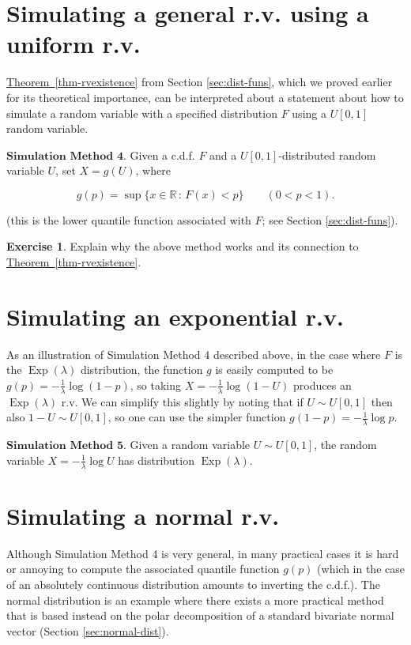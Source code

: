 \documentclass[11pt]{report}
\newcommand{\R}{\mathbb{R}}
\theoremstyle{plain}
\theoremstyle{definition}
\newtheorem{xexercise}[thm]{Exercise}
\begin{document}
\section{Simulating a general r.v. using a uniform r.v.}

\hyperref[thm-rvexistence]{Theorem~\ref*{thm-rvexistence}} from Section
\ref{sec:dist-funs}, which we proved earlier for its
theoretical importance, can be interpreted about a
statement about how to simulate a random variable with
a specified distribution $F$ using a $U[0,1]$ random
variable.

$\textbf{Simulation Method 4.}$ Given a c.d.f. $F$
and a $U[0,1]$-distributed random variable $U$, set
$X=g(U)$, where

\[
g(p) = \sup \{ x\in\R\,:\, F(x) < p \} \qquad (0<p<1).
\]

\noindent (this is the lower quantile function associated with
$F$; see Section \ref{sec:dist-funs}).

\begin{xexercise}
Explain why the above method works and its connection
to \hyperref[thm-rvexistence]{Theorem~\ref*{thm-rvexistence}}.
\end{xexercise}

\section{Simulating an exponential r.v.}

As an illustration of Simulation Method 4 described
above, in the case where $F$ is the
$\operatorname{Exp}(\lambda)$ distribution, the
function $g$ is easily computed to be
$g(p)=-\frac{1}{\lambda} \log(1-p)$, so taking
$X=-\frac{1}{\lambda} \log (1-U)$ produces an
$\operatorname{Exp}(\lambda)$ r.v. We can simplify
this slightly by noting that if $U\sim U[0,1]$ then
also $1-U \sim U[0,1]$, so one can use the simpler
function $g(1-p)=-\frac{1}{\lambda}\log p$.

$\textbf{Simulation Method 5.}$ Given a random
variable $U\sim U[0,1]$, the random variable
$X = -\frac{1}{\lambda}\log U$ has distribution
$\operatorname{Exp}(\lambda)$.

\section{Simulating a normal r.v.}

Although Simulation Method 4 is very general, in many
practical cases it is hard or annoying to compute the
associated quantile function $g(p)$ (which in the
case of an absolutely continuous distribution amounts
to inverting the c.d.f.). The normal distribution is
an example where there exists a more practical method
that is based instead on the polar decomposition of a
standard bivariate normal vector (Section
\ref{sec:normal-dist}).
\end{document}
